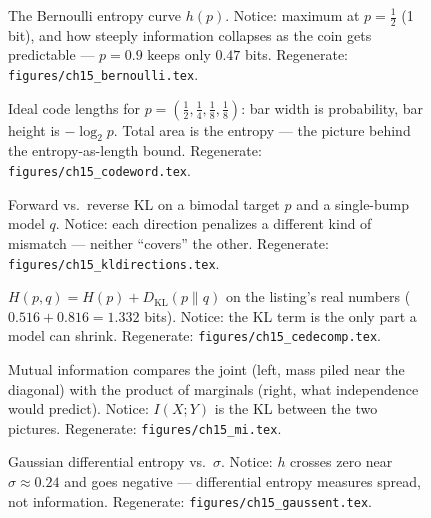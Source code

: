 \begin{figure}[htbp]\centering

\caption{The Bernoulli entropy curve $h(p)$. Notice: maximum at
$p=\tfrac12$ (1 bit), and how steeply information collapses as the
coin gets predictable --- $p=0.9$ keeps only $0.47$ bits. Regenerate:
\texttt{figures/ch15\_bernoulli.tex}.}\label{fig:bernh}
\end{figure}

\begin{figure}[htbp]\centering

\caption{Ideal code lengths for $p=(\tfrac12,\tfrac14,\tfrac18,
\tfrac18)$: bar width is probability, bar height is $-\log_2 p$. Total
area is the entropy --- the picture behind the entropy-as-length
bound. Regenerate: \texttt{figures/ch15\_codeword.tex}.}
\label{fig:codeword}
\end{figure}

\begin{figure}[htbp]\centering

\caption{Forward vs.\ reverse KL on a bimodal target $p$ and a
single-bump model $q$. Notice: each direction penalizes a different
kind of mismatch --- neither ``covers'' the other. Regenerate:
\texttt{figures/ch15\_kldirections.tex}.}\label{fig:kldir}
\end{figure}

\begin{figure}[htbp]\centering

\caption{$H(p,q)=H(p)+D_{\mathrm{KL}}(p\|q)$ on the listing's real
numbers ($0.516+0.816=1.332$ bits). Notice: the KL term is the only
part a model can shrink. Regenerate:
\texttt{figures/ch15\_cedecomp.tex}.}\label{fig:cedecomp}
\end{figure}

\begin{figure}[htbp]\centering

\caption{Mutual information compares the joint (left, mass piled near
the diagonal) with the product of marginals (right, what independence
would predict). Notice: $I(X;Y)$ is the KL between the two pictures.
Regenerate: \texttt{figures/ch15\_mi.tex}.}\label{fig:midiagram}
\end{figure}

\begin{figure}[htbp]\centering

\caption{Gaussian differential entropy vs.\ $\sigma$. Notice: $h$
crosses zero near $\sigma\approx0.24$ and goes negative ---
differential entropy measures spread, not information. Regenerate:
\texttt{figures/ch15\_gaussent.tex}.}\label{fig:gaussent}
\end{figure}
